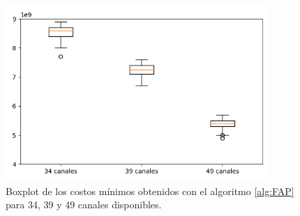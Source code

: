 \begin{figure}[H]
    \centering
    \includegraphics[width=10cm]{Graphics/boxplot.png}
    \caption{Boxplot de los costos mínimos obtenidos con el algoritmo \ref{alg:FAP} para 34, 39 y 49 canales disponibles.}
\end{figure}

